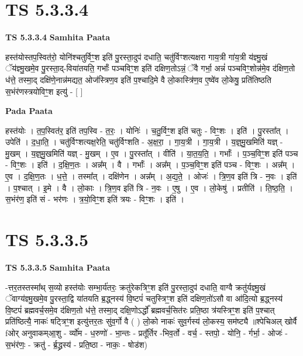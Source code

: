 \documentclass[17pt]{extarticle}
\begin{document}
\section*{ TS 5.3.3.4 }

\textbf{TS 5.3.3.4 } \newline
\textbf{Samhita Paata} \newline

हस्त॑योस्तप॒स्वित॑रो॒ योनि॑श्चतुर्विꣳ॒॒श इति॑ पु॒रस्ता॒दुप॑ दधाति॒ चतु॑र्विꣳशत्यक्षरा गाय॒त्री गा॑य॒त्री य॑ज्ञ्मु॒खं ॅय॑ज्ञ्मु॒खमे॒व पु॒रस्ता॒द्-विया॑तयति॒ गर्भाः᳚ पञ्चविꣳ॒॒श इति॑ दक्षिण॒तोऽन्नं॒ ॅवै गर्भा॒ अन्नं॑ पञ्चविꣳ॒॒शोन्न॑मे॒व द॑क्षिण॒तो ध॑त्ते॒ तस्मा॒द् दक्षि॑णे॒नान्न॑मद्यत॒ ओज॑स्त्रिण॒व इति॑ प॒श्चादि॒मे वै लो॒कास्त्रि॑ण॒व ए॒ष्वे॑व लो॒केषु॒ प्रति॑तिष्ठति स॒भंर॑णस्त्रयोविꣳ॒॒श इत्यु॑ - [  ] \newline

\textbf{Pada Paata} \newline

हस्त॑योः । त॒प॒स्वित॑र॒ इति॑ तप॒स्वि - त॒रः॒ । योनिः॑ । च॒तु॒र्विꣳ॒॒श इति॑ चतुः - विꣳ॒॒शः । इति॑ । पु॒रस्ता᳚त् । उपेति॑ । द॒धा॒ति॒ । चतु॑र्विꣳशत्यक्ष॒रेति॒ चतु॑र्विꣳशति - अ॒क्ष॒रा॒ । गा॒य॒त्री । गा॒य॒त्री । य॒ज्ञ्॒मु॒खमिति॑ यज्ञ् - मु॒खम् । य॒ज्ञ्॒मु॒खमिति॑ यज्ञ् - मु॒खम् । ए॒व । पु॒रस्ता᳚त् । वीति॑ । या॒त॒य॒ति॒ । गर्भाः᳚ । प॒ञ्च॒विꣳ॒॒श इति॑ पञ्च - विꣳ॒॒शः । इति॑ । द॒क्षि॒ण॒तः । अन्न᳚म् । वै । गर्भाः᳚ । अन्न᳚म् । प॒ञ्च॒विꣳ॒॒श इति॑ पञ्च - विꣳ॒॒शः । अन्न᳚म् । ए॒व । द॒क्षि॒ण॒तः । ध॒त्ते॒ । तस्मा᳚त् । दक्षि॑णेन । अन्न᳚म् । अ॒द्य॒ते॒ । ओजः॑ । त्रि॒ण॒व इति॑ त्रि - न॒वः । इति॑ । प॒श्चात् । इ॒मे । वै । लो॒काः । त्रि॒ण॒व इति॑ त्रि - न॒वः । ए॒षु । ए॒व । लो॒केषु॑ । प्रतीति॑ । ति॒ष्ठ॒ति॒ । स॒भंर॑ण॒ इति॑ सं - भर॑णः । त्र॒यो॒विꣳ॒॒श इति॑ त्रयः - विꣳ॒॒शः । इति॑ ।  \newline




\section*{ TS 5.3.3.5 }

\textbf{TS 5.3.3.5 } \newline
\textbf{Samhita Paata} \newline

-त्तर॒तस्तस्मा᳚थ् स॒व्यो हस्त॑योः सम्भा॒र्य॑तरः॒ क्रतु॑रेकत्रिꣳ॒॒श इति॑ पु॒रस्ता॒दुप॑ दधाति॒ वाग्वै क्रतु॑र्यज्ञ्मु॒खं ॅवाग्य॑ज्ञ्मु॒खमे॒व पु॒रस्ता॒द्वि या॑तयति ब्र॒द्ध्नस्य॑ वि॒ष्टपं॑ चतुस्त्रिꣳ॒॒श इति॑ दक्षिण॒तो॑ऽसौ वा आ॑दि॒त्यो ब्र॒द्ध्नस्य॑ वि॒ष्टपं॑ ब्रह्मवर्च॒समे॒व द॑क्षिण॒तो ध॑त्ते॒ तस्मा॒द् दक्षि॒णोऽर्द्धो᳚ ब्रह्मवर्च॒सित॑रः प्रति॒ष्ठा त्र॑यस्त्रिꣳ॒॒श इति॑ प॒श्चात् प्रति॑ष्ठित्यै॒ नाकः॑ षट्त्रिꣳ॒॒श इत्यु॑त्तर॒तः सु॑व॒र्गो वै ( ) लो॒को नाकः॑ सुव॒र्गस्य॑ लो॒कस्य॒ सम॑ष्ट्यै ॥श्पेचिअल् खोर्वै fओर् अनुवाकम्आ॒शु - र्व्यो॑म - ध॒रुणो॑ - भा॒न्तः - प्रतू᳚र्तिर -भिव॒र्तो - वर्च॒ - स्तपो॒ - योनि॒ - र्गर्भा॒ - ओजः॑ - स॒भंर॑णः॒ - क्रतु॑ - र्ब्र॒द्ध्रस्य॑ - प्रति॒ष्ठा - नाकः॒ - षोड॑श) \newline
\end{document}
